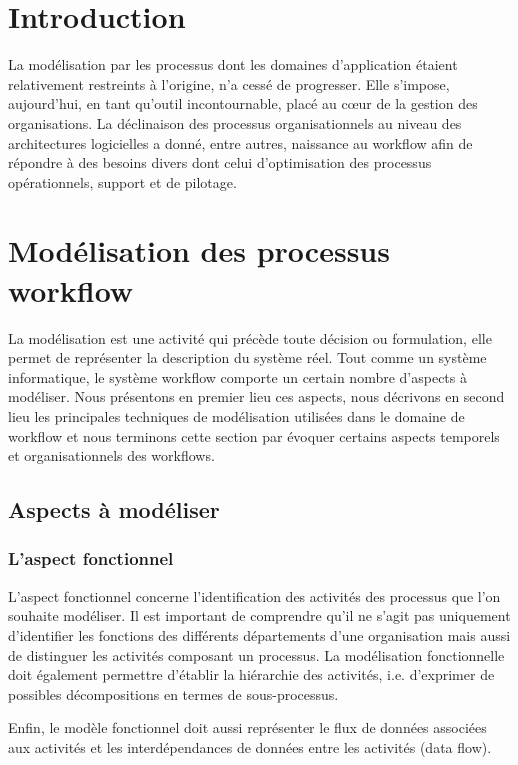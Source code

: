  	 \section{Introduction}
 	  
    
La modélisation par les processus dont les domaines d'application étaient relativement restreints à l'origine, n'a cessé de progresser. Elle s'impose, aujourd'hui, en tant qu'outil incontournable, placé au cœur de la gestion des organisations. La déclinaison des processus organisationnels au niveau des architectures logicielles a donné, entre autres, naissance au workflow afin de répondre à des besoins divers dont celui d'optimisation des processus opérationnels, support et de pilotage.

\section{Modélisation des processus workflow
}
La modélisation est une activité qui précède toute décision ou formulation, elle permet de représenter la description du système réel. Tout comme un système informatique, le système workflow comporte un certain nombre d'aspects à modéliser. Nous présentons en premier lieu ces aspects, nous décrivons en second lieu les principales techniques de modélisation utilisées dans le domaine de workflow et nous terminons cette section par évoquer certains aspects temporels et organisationnels des workflows.

\subsection{Aspects à modéliser}
\subsubsection{L'aspect fonctionnel}
L'aspect fonctionnel concerne l'identification des activités des processus que l'on souhaite modéliser. Il est important de comprendre qu'il ne s'agit pas uniquement d'identifier les fonctions des différents départements d'une organisation mais aussi de distinguer les activités composant un processus. La modélisation fonctionnelle doit également permettre d'établir la hiérarchie des activités, i.e. d'exprimer de possibles décompositions en termes de sous-processus. 

Enfin, le modèle fonctionnel doit aussi représenter le flux de données associées aux activités et les interdépendances de données entre les activités (data flow). 
